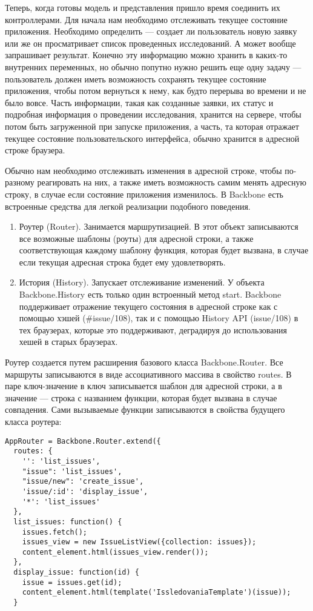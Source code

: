Теперь, когда готовы модель и представления пришло время соединить их контроллерами. Для начала нам необходимо отслеживать текущее состояние приложения. Необходимо определить --- создает ли пользователь новую заявку или же он просматривает список проведенных исследований. А может вообще запрашивает результат.  Конечно эту информацию можно хранить в каких-то внутренних переменных, но обычно попутно нужно решить еще одну задачу — пользователь должен иметь возможность сохранять текущее состояние приложения, чтобы потом вернуться к нему, как будто перерыва во времени и не было вовсе. Часть информации, такая как созданные заявки, их статус и подробная информация о проведении исследования, хранится на сервере, чтобы потом быть загруженной при запуске приложения, а часть, та которая отражает текущее состояние пользовательского интерфейса, обычно хранится в адресной строке браузера. 

Обычно нам необходимо отслеживать изменения в адресной строке, чтобы по-разному реагировать на них, а также иметь возможность самим менять адресную строку, в случае если состояние приложения изменилось. В Backbone есть встроенные средства для легкой реализации подобного поведения.
\begin{enumerate}
\item Роутер (Router). Занимается маршрутизацией. В этот объект записываются все возможные шаблоны (роуты) для адресной строки, а также соответствующая каждому шаблону функция, которая будет вызвана, в случае если текущая адресная строка будет ему удовлетворять\cite{backbone}.

\item История (History). Запускает отслеживание изменений. У объекта Backbone.History есть только один встроенный метод start. Backbone поддерживает отражение текущего состояния в адресной строке как с помощью хэшей (\#issue/108), так и с помощью History API (issue/108) в тех браузерах, которые это поддерживают, деградируя до использования хешей в старых браузерах\cite{backbone}.
\end{enumerate}

Роутер создается путем расширения базового класса Backbone.Router. Все маршруты записываются в виде ассоциативного массива в свойство routes. В паре ключ-значение в ключ записывается шаблон для адресной строки, а в значение --- строка с названием функции, которая будет вызвана в случае совпадения. Сами вызываемые функции записываются в свойства будущего класса роутера:
\begin{lstlisting}
AppRouter = Backbone.Router.extend({
  routes: {
    '': 'list_issues',
    "issue": 'list_issues',
    "issue/new": 'create_issue',
    'issue/:id': 'display_issue',
    '*': 'list_issues'
  },
  list_issues: function() {
    issues.fetch();
    issues_view = new IssueListView({collection: issues});
    content_element.html(issues_view.render());
  },
  display_issue: function(id) {
    issue = issues.get(id);
    content_element.html(template('IssledovaniaTemplate')(issue));
  }
\end{lstlisting}

